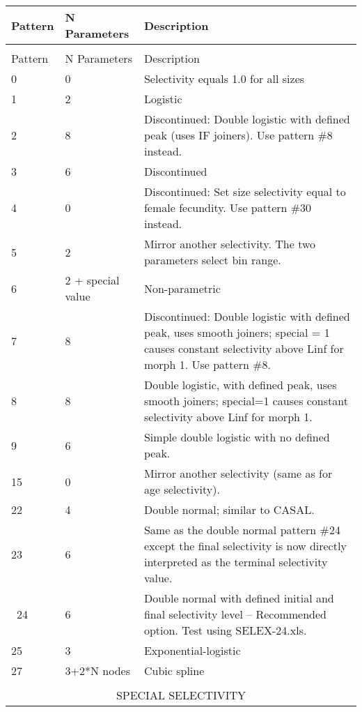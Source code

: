 \begin{center}
	\begin{longtable}{p{2cm} p{3cm} p{10cm}}
		\endfirsthead

		\hline
		Pattern & N Parameters & Description \\
		\hline
		\endhead

		\endfoot
		\endlastfoot

		\hline
		\multicolumn{3}{c}{SIZE SELECTIVITY}\\
		Pattern & N Parameters & Description \\
		\hline
		0 & 0 & Selectivity equals 1.0 for all sizes \\
		1 & 2 & Logistic \\
		2 & 8 & Discontinued: Double logistic with defined peak (uses IF joiners). Use pattern \#8 instead.\\
		3 & 6 & Discontinued \\
		4 & 0 & Discontinued: Set size selectivity equal to female fecundity. Use pattern \#30 instead.\\
		5 & 2 & Mirror another selectivity. The two parameters select bin range.\\
		6 & 2 + special value & Non-parametric \\
		7 & 8 & Discontinued: Double logistic with defined peak, uses smooth joiners; special = 1 causes constant selectivity above Linf for morph 1.  Use pattern \#8.\\
		8 & 8 & Double logistic, with defined peak, uses smooth joiners; special=1 causes constant selectivity above Linf for morph 1.  \\
		9 & 6 & Simple double logistic with no defined peak.\\
		15 & 0 & Mirror another selectivity (same as for age selectivity).\\
		22 & 4 & Double normal; similar to CASAL.\\
		23 & 6 & Same as the double normal pattern \#24 except the final selectivity is now directly interpreted as the terminal selectivity value.\\\
		24 & 6 & Double normal with defined initial and final selectivity level – Recommended option.  Test using SELEX-24.xls. \\
		25 & 3 & Exponential-logistic \\
		27 & 3+2*N nodes & Cubic spline\\
		\hline
		\\
		\multicolumn{3}{c}{SPECIAL SELECTIVITY}\\

\end{longtable}
\end{center}
